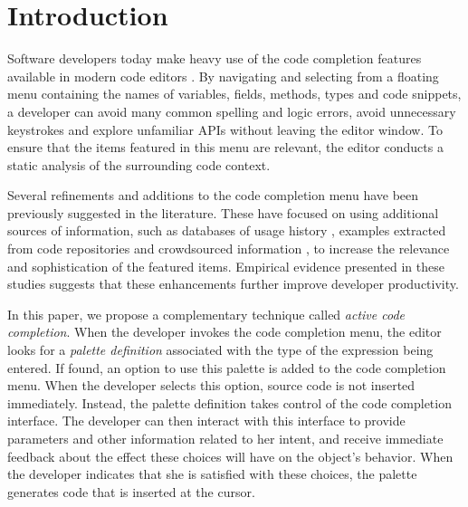 \documentclass[conference]{IEEEtran}
\begin{document}




%
\IEEEpeerreviewmaketitle



\section{Introduction}


Software developers today make heavy use of the code completion features available in modern code editors \cite{murphy_how_2006}. By navigating and selecting from a floating menu containing the names of variables, fields, methods, types and code snippets, a developer can avoid many common spelling and logic errors, avoid unnecessary keystrokes and explore unfamiliar APIs without leaving the editor window. To ensure that the items featured in this menu are relevant, the editor conducts a static analysis of the surrounding code context. %

Several refinements and additions to the code completion menu have been previously suggested in the literature. These have focused on using additional sources of information, such as databases of usage history \cite{robbes_how_2008}, examples extracted from code repositories \cite{bruch_learning_2009} and crowdsourced information \cite{mooty_calcite:_2010}, to increase the relevance and sophistication of the featured items. Empirical evidence presented in these studies suggests that these enhancements further improve developer productivity.

In this paper, we propose a complementary technique called {\it active code completion}. When the developer invokes the code completion menu, the editor looks for a {\it palette definition} associated with the type of the expression being entered. If found, an option to use this palette is added to the code completion menu.
When the developer selects this option, source code is not inserted immediately. Instead, the palette definition takes control of the code completion interface. The developer can then interact with this interface to provide parameters and other information related to her intent, and receive immediate feedback about the effect these choices will have on the object's behavior. When the developer indicates that she is satisfied with these choices, the palette generates code that is inserted at the cursor. 
\end{document}
